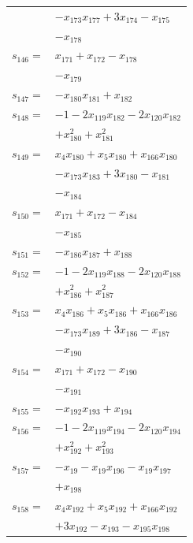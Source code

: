 \begin{longtable}{@{}r@{\;}l@{}}
 & \(\displaystyle -x_{173}x_{177} +3x_{174} -x_{175}\) \\
 & \(\displaystyle -x_{178}\) \\[3pt]
\(s_{146}=\) & \(\displaystyle x_{171} +x_{172} -x_{178}\) \\
 & \(\displaystyle -x_{179}\) \\[3pt]
\(s_{147}=\) & \(\displaystyle -x_{180}x_{181} +x_{182}\) \\[3pt]
\(s_{148}=\) & \(\displaystyle -1 -2x_{119}x_{182} -2x_{120}x_{182}\) \\
 & \(\displaystyle +x_{180}^{2} +x_{181}^{2}\) \\[3pt]
\(s_{149}=\) & \(\displaystyle x_{4}x_{180} +x_{5}x_{180} +x_{166}x_{180}\) \\
 & \(\displaystyle -x_{173}x_{183} +3x_{180} -x_{181}\) \\
 & \(\displaystyle -x_{184}\) \\[3pt]
\(s_{150}=\) & \(\displaystyle x_{171} +x_{172} -x_{184}\) \\
 & \(\displaystyle -x_{185}\) \\[3pt]
\(s_{151}=\) & \(\displaystyle -x_{186}x_{187} +x_{188}\) \\[3pt]
\(s_{152}=\) & \(\displaystyle -1 -2x_{119}x_{188} -2x_{120}x_{188}\) \\
 & \(\displaystyle +x_{186}^{2} +x_{187}^{2}\) \\[3pt]
\(s_{153}=\) & \(\displaystyle x_{4}x_{186} +x_{5}x_{186} +x_{166}x_{186}\) \\
 & \(\displaystyle -x_{173}x_{189} +3x_{186} -x_{187}\) \\
 & \(\displaystyle -x_{190}\) \\[3pt]
\(s_{154}=\) & \(\displaystyle x_{171} +x_{172} -x_{190}\) \\
 & \(\displaystyle -x_{191}\) \\[3pt]
\(s_{155}=\) & \(\displaystyle -x_{192}x_{193} +x_{194}\) \\[3pt]
\(s_{156}=\) & \(\displaystyle -1 -2x_{119}x_{194} -2x_{120}x_{194}\) \\
 & \(\displaystyle +x_{192}^{2} +x_{193}^{2}\) \\[3pt]
\(s_{157}=\) & \(\displaystyle -x_{19} -x_{19}x_{196} -x_{19}x_{197}\) \\
 & \(\displaystyle +x_{198}\) \\[3pt]
\(s_{158}=\) & \(\displaystyle x_{4}x_{192} +x_{5}x_{192} +x_{166}x_{192}\) \\
 & \(\displaystyle +3x_{192} -x_{193} -x_{195}x_{198}\) \\

\end{longtable}
